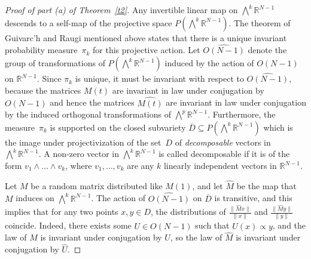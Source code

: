 \documentclass[12pt]{article}
\newcommand{\1}{\mathbf{1}}
\begin{document}
\begin{proof}[Proof of part (a) of Theorem~\ref{t2}]
Any invertible linear map on $\bigwedge^k \mathbb{R}^{N-1}$ descends to a self-map of the projective space $P\left(\bigwedge^k \mathbb{R}^{N-1}\right)$. The theorem of Guivarc'h and Raugi mentioned above states that there is a unique invariant probability measure~$\pi_k$ for this projective action. Let $\widehat{O(N-1)}$ denote the group of transformations of $P\left(\bigwedge^k \mathbb{R}^{N-1}\right)$ induced by the action of $O(N-1)$ on $\mathbb{R}^{N-1}$. Since $\pi_k$ is unique, it must be invariant with respect to $\widehat{O(N-1)}$, because the matrices $M(t)$ are invariant in law under conjugation by $O(N-1)$ and hence the matrices $\widehat{M(t)}$ are invariant in law under conjugation by the induced orthogonal transformations of $\bigwedge^p \mathbb{R}^{N-1}$. Furthermore, the measure~$\pi_k$ is supported on the closed subvariety $\overline{D} \subseteq P\left(\bigwedge^k \mathbb{R}^{N-1}\right)$ which is the image under projectivization of the set~$D$ of  \emph{decomposable} vectors in $\bigwedge^k \mathbb{R}^{N-1}$. A non-zero vector in $\bigwedge^k \mathbb{R}^{N-1}$ is called decomposable if it is of the form $v_1 \wedge \dots \wedge v_k$, where $v_1, \dots, v_k$ are any $k$ linearly independent vectors in $\mathbb{R}^{N-1}$. 

Let $M$ be a random matrix distributed like $M(1)$, and let $\hat{M}$ be the map that $M$ induces on $\bigwedge^k\mathbb{R}^{N-1}$.
The action of $\widehat{O(N-1)}$ on $\overline{D}$ is transitive, and this implies that for any two points $x, y \in D$, the distributions of $\frac{\|\hat{M}x\|}{\|x\|}$ and $\frac{\|\hat{M}y\|}{\|y\|}$ coincide. Indeed, there exists some $U \in O(N-1)$ such that $\hat{U}(x) \propto y$, and the law of $M$ is invariant under conjugation by $U$, so the law of $\hat{M}$ is invariant under conjugation by $\hat{U}$.


\end{proof}
\end{document}
